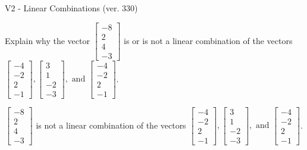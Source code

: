 \begin{exercise}
  \begin{exerciseTitle}V2 - Linear Combinations (ver. 330)\end{exerciseTitle}
  \begin{exerciseStatement}
    Explain why the vector \(\left[\begin{array}{c}
-8 \\
2 \\
4 \\
-3
\end{array}\right]\)  is or is not a linear 
	combination of the vectors \(\left[\begin{array}{c}
-4 \\
-2 \\
2 \\
-1
\end{array}\right] , \left[\begin{array}{c}
3 \\
1 \\
-2 \\
-3
\end{array}\right] , \text{ and } \left[\begin{array}{c}
-4 \\
-2 \\
2 \\
-1
\end{array}\right]\).
	


  \end{exerciseStatement}
  \begin{exerciseAnswer}
   \(\left[\begin{array}{c}
-8 \\
2 \\
4 \\
-3
\end{array}\right]\) 
  	 is not  
	a linear combination of the vectors \(\left[\begin{array}{c}
-4 \\
-2 \\
2 \\
-1
\end{array}\right] , \left[\begin{array}{c}
3 \\
1 \\
-2 \\
-3
\end{array}\right] , \text{ and } \left[\begin{array}{c}
-4 \\
-2 \\
2 \\
-1
\end{array}\right]\).

	
  


  \end{exerciseAnswer}
\end{exercise}